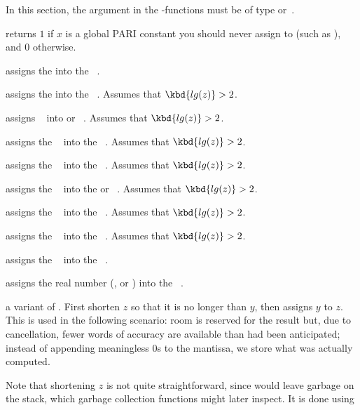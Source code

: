 In this section, the  argument in the -functions must be of type
 or~.

 returns $1$ if $x$ is a global PARI
constant you should never assign to (such as ), and $0$
otherwise.

 assigns the   into the
~.

 assigns the   into the
~. Assumes that $\kbd{lg(z)} > 2$.

 assigns ~ into  or
~. Assumes that $\kbd{lg(z)} > 2$.

 assigns the ~ into the
~. Assumes that $\kbd{lg(z)} > 2$.

 assigns the ~ into the
~. Assumes that $\kbd{lg(z)} > 2$.

 assigns the ~ into the
 or ~. Assumes that $\kbd{lg(z)} > 2$.

 assigns the ~ into the
~. Assumes that $\kbd{lg(z)} > 2$.

 assigns the ~ into the
~. Assumes that $\kbd{lg(z)} > 2$.

 assigns the ~ into the
~.

 assigns the real number
(,  or )  into the ~.

 a variant of . First shorten
$z$ so that it is no longer than $y$, then assigns $y$ to $z$. This is used
in the following scenario: room is reserved for the result but, due to
cancellation, fewer words of accuracy are available than had been
anticipated; instead of appending meaningless $0$s to the mantissa, we store
what was actually computed.

Note that shortening $z$ is not quite straightforward, since 
would leave garbage on the stack, which garbage collection functions might
later inspect. It is done using

